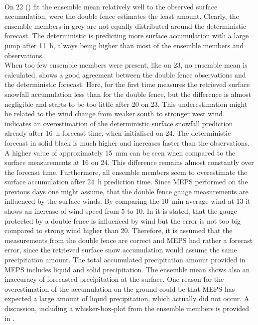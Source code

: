 \\
On \SI{22}{\dec} () fit the ensemble mean relatively well to the observed surface accumulation, were the double fence estimates the least amount. Clearly, the ensemble members in grey are not equally distributed around the deterministic forecast. The deterministic is predicting more surface accumulation with a large jump after \SI{11}{\hour}, always being higher than most of the ensemble members and observations. 
\\
When too few ensemble members were present, like on \SI{23}{\dec}, no ensemble mean is calculated.  shows a good agreement between the double fence observations and the deterministic forecast. Here, for the first time measures the retrieved surface snowfall accumulation less than for the double fence, but the difference is almost negligible and starts to be too little after \SI{20}{\UTC} on \SI{23}{\dec}. This underestimation might be related to the wind change from weaker south to stronger west wind.
\\
 indicates an overestimation of the deterministic surface snowfall prediction already after \SI{16}{\hour} forecast time, when initialised on \SI{24}{\dec}. The deterministic forecast in solid black is much higher and increases faster than the observations. A higher value of approximately \SI{15}{\mm} can be seen when compared to the surface measurements at \SI{16}{\UTC} on \SI{24}{\dec}. This difference remains almost constantly over the forecast time. Furthermore, all ensemble members seem to overestimate the surface accumulation after \SI{24}{\hour} prediction time. Since MEPS performed on the previous days one might assume, that the double fence gauge measurements are influenced by the surface winds. By comparing the \SI{10}{\minute} average wind at \SI{13}{\UTC} it shows an increase of wind speed from \SI{5}{\mPs} to \SI{10}{\mPs}. In \cite{wolff_wmo_2018} it is stated, that the gauge protected by a double fence is influenced by wind but the error is not too big compared to strong wind higher than \SI{20}{\mPs}. Therefore, it is assumed that the measurements from the double fence are correct and MEPS had rather a forecast error, since the retrieved surface snow accumulation would assume the same precipitation amount. The total accumulated precipitation amount provided in MEPS includes liquid and solid precipitation. The ensemble mean shows also an inaccuracy of forecasted precipitation at the surface. One reason for the overestimation of the accumulation on the ground could be that MEPS has expected a large amount of liquid precipitation, which actually did not occur. A discussion, including a whisker-box-plot from the ensemble members is provided in .
